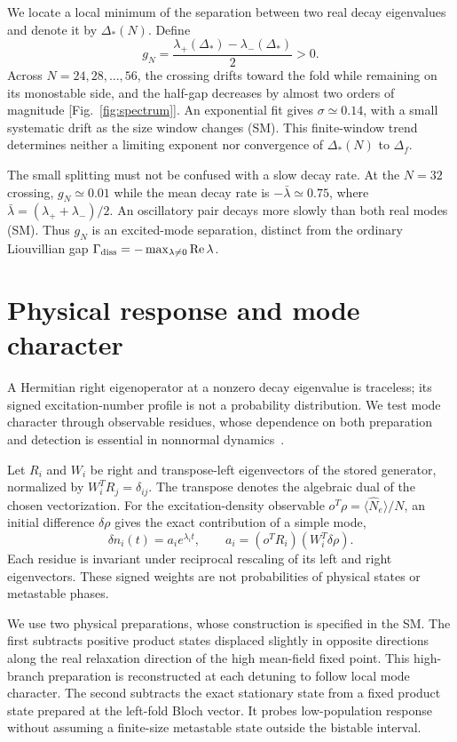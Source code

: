 \documentclass[aps,pra,twocolumn,superscriptaddress,amsmath,amssymb,reprint,floatfix]{revtex4-2}
\begin{document}
We locate a local minimum of the separation between two real decay eigenvalues and denote it by $\Delta_*(N)$. Define
\begin{equation}
 g_N=\frac{\lambda_+(\Delta_*)-\lambda_-(\Delta_*)}{2}>0.
 \label{eq:gap}
\end{equation}
Across $N=24,28,\ldots,56$, the crossing drifts toward the fold while remaining on its monostable side, and the half-gap decreases by almost two orders of magnitude [Fig.~\ref{fig:spectrum}]. An exponential fit gives $\sigma\simeq0.14$, with a small systematic drift as the size window changes (SM). This finite-window trend determines neither a limiting exponent nor convergence of $\Delta_*(N)$ to $\Delta_f$.

The small splitting must not be confused with a slow decay rate. At the $N=32$ crossing, $g_N\simeq0.01$ while the mean decay rate is $-\bar\lambda\simeq0.75$, where $\bar\lambda=(\lambda_++\lambda_-)/2$. An oscillatory pair decays more slowly than both real modes (SM). Thus $g_N$ is an excited-mode separation, distinct from the ordinary Liouvillian gap $\Gamma_{\rm diss}=-\max_{\lambda\ne0}\operatorname{Re}\lambda$.

\section{Physical response and mode character}
\label{sec:modes}
A Hermitian right eigenoperator at a nonzero decay eigenvalue is traceless; its signed excitation-number profile is not a probability distribution. We test mode character through observable residues, whose dependence on both preparation and detection is essential in nonnormal dynamics~\cite{MoriShirai2020,Molina2026}.

Let $R_i$ and $W_i$ be right and transpose-left eigenvectors of the stored generator, normalized by $W_i^TR_j=\delta_{ij}$. The transpose denotes the algebraic dual of the chosen vectorization. For the excitation-density observable $o^T\rho=\langle\hat N_e\rangle/N$, an initial difference $\delta\rho$ gives the exact contribution of a simple mode,
\begin{equation}
 \delta n_i(t)=a_i e^{\lambda_i t},\qquad
 a_i=(o^TR_i)(W_i^T\delta\rho).
 \label{eq:residue}
\end{equation}
Each residue is invariant under reciprocal rescaling of its left and right eigenvectors. These signed weights are not probabilities of physical states or metastable phases.

We use two physical preparations, whose construction is specified in the SM. The first subtracts positive product states displaced slightly in opposite directions along the real relaxation direction of the high mean-field fixed point. This high-branch preparation is reconstructed at each detuning to follow local mode character. The second subtracts the exact stationary state from a fixed product state prepared at the left-fold Bloch vector. It probes low-population response without assuming a finite-size metastable state outside the bistable interval.
\end{document}
